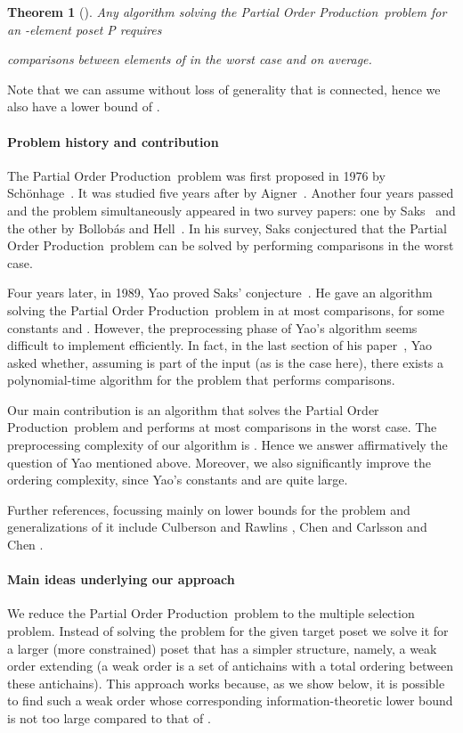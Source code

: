 \documentclass[12pt,oneside]{article}
\newtheorem{theorem}{Theorem}
\newcommand{\partsort}{{\sc Partial Order Production}}
\begin{document}
\begin{theorem}[\hspace{-.01em}\cite{S76, A81, Y89}]
Any algorithm solving the \partsort\ problem for an -element poset P requires

comparisons between elements of  in the worst case and on average.
\end{theorem}

Note that we can assume without loss of generality that  is connected, hence we also have a lower bound of .

\paragraph{Problem history and contribution}
The \partsort\ problem was first proposed in 1976 by Sch\"onhage~\cite{S76}. It was studied five years after by Aigner~\cite{A81}. Another four years passed and the problem simultaneously appeared in two survey papers: one by Saks~\cite{S85} and the other by Bollob\'as and Hell~\cite{BH85}. In his survey, Saks conjectured that the \partsort\ problem can be solved by performing  comparisons in the worst case.

Four years later, in 1989, Yao proved Saks' conjecture~\cite{Y89}. He gave an algorithm solving the \partsort\ problem in at most  comparisons, for some constants  and . However, the preprocessing phase of Yao's algorithm seems difficult to implement efficiently. In fact, in the last section of his paper~\cite{Y89}, Yao asked whether, assuming  is part of the input (as is the case here), there exists a polynomial-time algorithm for the problem that performs  comparisons.

Our main contribution is an algorithm that solves the \partsort\ problem and performs at most  comparisons in the worst case. The preprocessing complexity of our algorithm is . Hence we answer affirmatively the question of Yao \cite{Y89} mentioned above. Moreover, we also significantly improve the ordering complexity, since Yao's constants  and  are quite large.

Further references, focussing mainly on lower bounds for the problem and generalizations of it include Culberson and Rawlins \cite{CR88}, Chen \cite{C94} and Carlsson and Chen \cite{CC94}.

\paragraph{Main ideas underlying our approach} We reduce the \partsort\ problem to the multiple selection problem. Instead of solving the problem for the given target poset  we solve it for a larger (more constrained) poset that has a simpler structure, namely, a weak order  extending  (a weak order is a set of antichains with a total ordering between these antichains). This approach works because, as we show below, it is possible to find such a weak order  whose corresponding information-theoretic lower bound  is not too large compared to that of .
\end{document}
